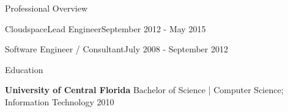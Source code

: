 \documentclass{resume} %
\begin{document}
\begin{rSection}{Professional Overview}
\begin{rNewRole}{Cloudspace}{Lead Engineer}{September 2012 - May 2015}
  \end{rNewRole}
  
  
  \begin{rCompany}{Software Engineer / Consultant}{July 2008 - September 2012}{}

  \end{rCompany}
  
  
  
\end{rSection}

\vspace{0.5em} %
\begin{rSection}{Education}
  
  {\bf University of Central Florida } Bachelor of Science | Computer Science; Information Technology  \hfill 2010
  
\end{rSection}
\end{document}
